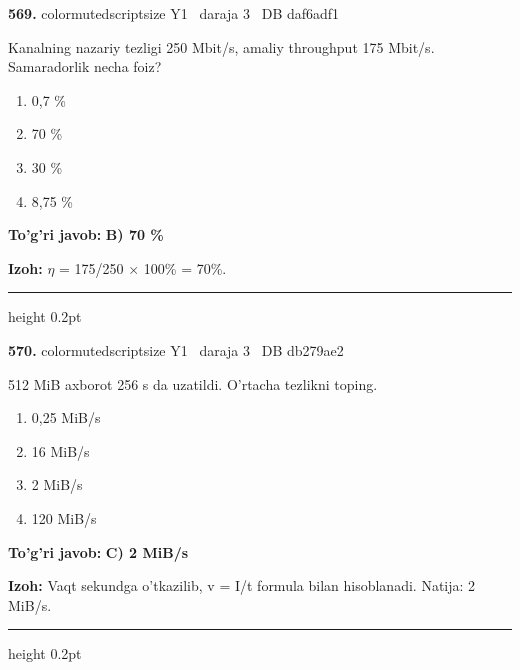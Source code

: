 \documentclass[10pt,a4paper,oneside]{article}
\begin{document}
\noindent\textbf{\color{ink}569.}  {color{muted}scriptsize Y1 \textbullet\ daraja 3 \textbullet\ DB daf6adf1}
\par
Kanalning nazariy tezligi 250 Mbit/s, amaliy throughput 175 Mbit/s. Samaradorlik necha foiz?
\begin{enumerate}[label=\Alph*),leftmargin=9mm]
\item 0,7 \%
\item 70 \%
\item 30 \%
\item 8,75 \%
\end{enumerate}
\begin{tcolorbox}[enhanced,breakable,colback=teal!4,colframe=teal!50!black,boxrule=0.5pt,arc=1.1mm,left=3mm,right=3mm,top=1.7mm,bottom=1.7mm,before skip=2mm,after skip=2mm]
\textbf{\color{teal}To'g'ri javob:} \textbf{B) 70 \%}
\par\smallskip
\textbf{Izoh:} \ensuremath{\eta} = 175/250 \ensuremath{\times} 100\% = 70\%.
\end{tcolorbox}
\vspace{2mm}\hrule height 0.2pt \vspace{3mm}

\noindent\textbf{\color{ink}570.}  {color{muted}scriptsize Y1 \textbullet\ daraja 3 \textbullet\ DB db279ae2}
\par
512 MiB axborot 256 s da uzatildi. O'rtacha tezlikni toping.
\begin{enumerate}[label=\Alph*),leftmargin=9mm]
\item 0,25 MiB/s
\item 16 MiB/s
\item 2 MiB/s
\item 120 MiB/s
\end{enumerate}
\begin{tcolorbox}[enhanced,breakable,colback=teal!4,colframe=teal!50!black,boxrule=0.5pt,arc=1.1mm,left=3mm,right=3mm,top=1.7mm,bottom=1.7mm,before skip=2mm,after skip=2mm]
\textbf{\color{teal}To'g'ri javob:} \textbf{C) 2 MiB/s}
\par\smallskip
\textbf{Izoh:} Vaqt sekundga o'tkazilib, v = I/t formula bilan hisoblanadi. Natija: 2 MiB/s.
\end{tcolorbox}
\vspace{2mm}\hrule height 0.2pt \vspace{3mm}
\end{document}
